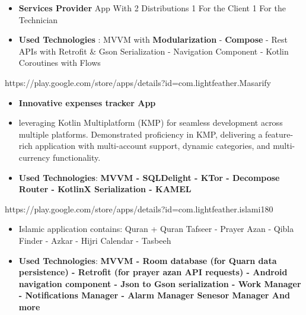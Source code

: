 \documentclass[10pt,a4paper,ragged2e,withhyper]{altacv}
\begin{document}
    \begin{paracol}{1}

        \begin{itemize}
            \item \textbf{Services Provider} App With 2 Distributions 1 For the Client 1 For the Technician
            \item \textbf{Used Technologies} : MVVM with \textbf{Modularization} - \textbf{Compose} - Rest APIs with Retrofit \& Gson Serialization - Navigation Component - Kotlin Coroutines with Flows
        \end{itemize}
        \divider



        {\cvrepo{\color{AndroidGreenColor}|\faGooglePlay\faAndroid}
        {https://play.google.com/store/apps/details?id=com.lightfeather.Masarify}}{}{}
        \begin{itemize}
            \item \textbf{Innovative expenses tracker App}
            \item leveraging Kotlin Multiplatform (KMP) for seamless development across multiple platforms.
            Demonstrated proficiency in KMP,
            delivering a feature-rich application with multi-account support, dynamic categories, and multi-currency functionality.
            \item \textbf{Used Technologies}: \textbf{MVVM -
            SQLDelight - KTor - Decompose Router - KotlinX Serialization - KAMEL
            }
        \end{itemize}
        \divider


        {\cvrepo{\color{AndroidGreenColor}|\faGooglePlay\faAndroid}
        {https://play.google.com/store/apps/details?id=com.lightfeather.islami180}}{}{}
        \begin{itemize}
            \item \textbf{}Islamic application contains:
            Quran + Quran Tafseer - Prayer Azan - Qibla Finder - Azkar - Hijri Calendar - Tasbeeh
            \item \textbf{Used Technologies}: \textbf{MVVM -
            Room database (for Quarn data persistence) -
            Retrofit (for prayer azan API requests) -
            Android navigation component -
            Json to Gson serialization -
            Work Manager -
            Notifications Manager -
            Alarm Manager
            Senesor Manager And more
            }
        \end{itemize}
        \divider


\end{paracol}
\end{document}
